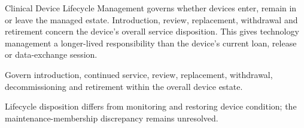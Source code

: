 Clinical Device Lifecycle Management governs whether devices enter, remain in or leave the managed estate. Introduction, review, replacement, withdrawal and retirement concern the device's overall service disposition. This gives technology management a longer-lived responsibility than the device's current loan, release or data-exchange session.



Govern introduction, continued service, review, replacement, withdrawal, decommissioning and retirement within the overall device estate.



Lifecycle disposition differs from monitoring and restoring device condition; the maintenance-membership discrepancy remains unresolved.


